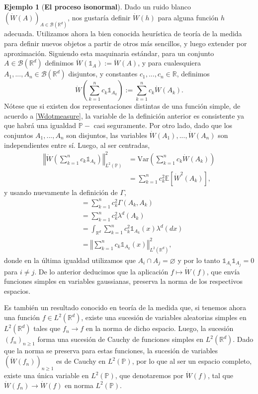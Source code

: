 \documentclass[letterpaper,twoside,12pt]{book}
\newcommand{\R}{\mathbb{R}}
\newcommand{\B}{\mathcal{B}}
\newcommand{\E}{\mathbb{E}}
\renewcommand{\P}{\mathbb{P}}
\newcommand{\W}{\dot{W}}
\newcommand{\1}{\mathds{1}}
\renewcommand{\to}{\rightarrow}
\newcommand{\norm}[1]{\left\Vert #1 \right\Vert}
\theoremstyle{definition}
\theoremstyle{definition}
\theoremstyle{remark}
\theoremstyle{definition}
\theoremstyle{definition}
\theoremstyle{definition}
\theoremstyle{definition}
\newtheorem{ejem}{Ejemplo}
\theoremstyle{definition}
\begin{document}
\begin{ejem}[\textbf{El proceso isonormal}]\label{ruidoprocesoiso}
Dado un ruido blanco $\left(\W(A)\right)_{A\in \B(\R^d)}$, nos gustaría definir $\W(h)$ para alguna función $h$ adecuada.  Utilizamos ahora la bien conocida heurística de teoría de la medida para definir nuevos objetos a partir de otros más sencillos, y luego extender por aproximación. Siguiendo esta maquinaria estándar, para un conjunto $A\in \B(\R^d)$ definimos $\W(\1_A):=\W(A)$, y para cualesquiera $A_1,...,A_n\in \B(\R^{d})$ disjuntos, y constantes $c_1,...,c_n\in \R$, definimos
\[
\W \left(\sum_{k=1}^{n}c_k\1_{A_k}\right):=\sum_{k=1}^{n}c_k\W(A_k).    
\]
Nótese que si existen dos representaciones distintas de una función simple, de acuerdo a \eqref{Wdotmeasure}, la variable de la definición anterior es consistente ya que habrá una igualdad $\P-$ casi seguramente. Por otro lado, dado que los conjuntos $A_1,...,A_n$ son disjuntos, las variables $\W(A_1),...,\W(A_n)$ son independientes entre sí. Luego, al ser centradas,
\begin{align*}
    \norm{\W \left(\sum_{k=1}^{n}c_k\1_{A_k}\right)}_{L^{2}(\P)}^2&=\text{Var}\left(\sum_{k=1}^{n}c_k\W(A_k)\right)\\
    &=\sum_{k=1}^{n}c_k^2 \E\left[\W^2(A_k)\right],
\end{align*}
y usando nuevamente la definición de $\Gamma$, 
\begin{align*}
    &=\sum_{k=1}^{n}c_k^2 \Gamma(A_k,A_k)\\
    &=\sum_{k=1}^{n}c_k^2\lambda^{d}(A_k)\\
    &=\int_{\R^d}\sum_{k=1}^{n}c_k^2\1_{A_k}(x)\lambda^d(dx)\\
    &=\norm{\sum_{k=1}^{n}c_k\1_{A_k}(x)}^2_{L^{2}(\R^{d})},
\end{align*}
donde en la última igualdad utilizamos que $A_i\cap A_j=\varnothing$ y por lo tanto $\1_{A_i}\1_{A_j}=0$ para $i\neq j$. De lo anterior deducimos que la aplicación $f\longmapsto \W(f)$, que envía funciones simples en variables gaussianas, preserva la norma de los respectivos espacios.

Es también un resultado conocido en teoría de la medida que, si tenemos ahora una función $f\in L^{2}(\R^{d})$, existe una sucesión de variables aleatorias simples en $L^{2}(\R^d)$ tales que $f_n\to f$ en la norma de dicho espacio. Luego, la sucesión $(f_n)_{n\ge 1}$ forma una sucesión de Cauchy de funciones simples en $L^2(\R^{d})$. Dado que la norma se preserva para estas funciones, la sucesión de variables $(\W(f_n))_{n\ge 1}$ es de Cauchy en $L^{2}(\P)$, por lo que al ser un espacio completo, existe una única variable en $L^{2}(\P)$, que denotaremos por $\W(f)$, tal que $\W(f_n)\longrightarrow \W(f)$ en norma $L^{2}(\P)$.


\end{ejem}
\end{document}
